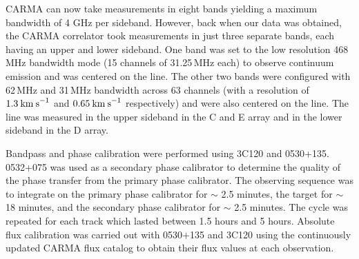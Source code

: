 CARMA can now take measurements in eight bands yielding a maximum bandwidth of 4 GHz per sideband. However, back when our data was obtained, the CARMA correlator took measurements in just three separate bands, each having an upper and lower sideband. One band was set to the low resolution 468\,MHz bandwidth mode (15 channels of 31.25\,MHz each) to observe continuum emission and was centered on the line. The other two bands were configured with 62\,MHz and 31\,MHz bandwidth across 63 channels (with a resolution of $1.3\>{\rm km\>s}^{-1}$ and $0.65\>{\rm km\>s}^{-1}$ respectively) and were also centered on the line. The line was measured in the upper sideband in the C and E array and in the lower sideband in the D array.

Bandpass and phase calibration were performed using 3C120 and 0530+135. 0532+075 was used as a secondary phase calibrator to determine the quality of the phase transfer from the primary phase calibrator. The observing sequence was to integrate on the primary phase calibrator for $\sim$ 2.5 minutes, the target for $\sim$ 18 minutes, and the secondary phase calibrator for $\sim$ 2.5 minutes. The cycle was repeated for each track which lasted between 1.5 hours and 5 hours. Absolute flux calibration was carried out with 0530+135 and 3C120 using the continuously updated CARMA flux catalog to obtain their flux values at each observation.

